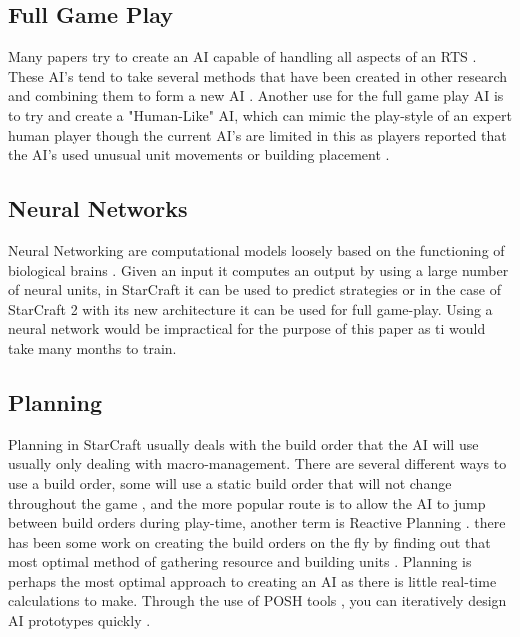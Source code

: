 \documentclass[journal]{IEEEtran}
\begin{document}
\subsection{Full Game Play}
Many papers try to create an AI capable of handling all aspects of an RTS \cite{Agents}\cite{Hierarchical}\cite{HumanLevel}\cite{SCAIL}. These AI's tend to take several methods that have been created in other research and combining them to form a new AI \cite{Agents}. Another use for the full game play AI is to try and create a "Human-Like" AI, which can mimic the play-style of an expert human player though the current AI's are limited in this as players reported that the AI's used unusual unit movements or building placement \cite{EvalHuman}.

\subsection{Neural Networks}
Neural Networking are computational models loosely based on the functioning of biological brains \cite{Deep}. Given an input it computes an output by using a large number of neural units, in StarCraft it can be used to predict strategies or in the case of StarCraft 2 with its new architecture it can be used for full game-play. Using a neural network would be impractical for the purpose of this paper as ti would take many months to train.

\subsection{Planning}
Planning in StarCraft usually deals with the build order that the AI will use usually only dealing with macro-management. There are several different ways to use a build order, some will use a static build order that will not change throughout the game \cite{Swen}, and the more popular route is to allow the AI to jump between build orders during play-time, another term is Reactive Planning \cite{Fuzzy}\cite{OnlineEvo}\cite{GoalDriven}. there has been some work on creating the build orders on the fly by finding out that most optimal method of gathering resource and building units \cite{BuildOrder}. Planning is perhaps the most optimal approach to creating an AI as there is little real-time calculations to make. Through the use of POSH tools \cite{POSH}, you can iteratively design AI prototypes quickly \cite{Swen}.
\end{document}
